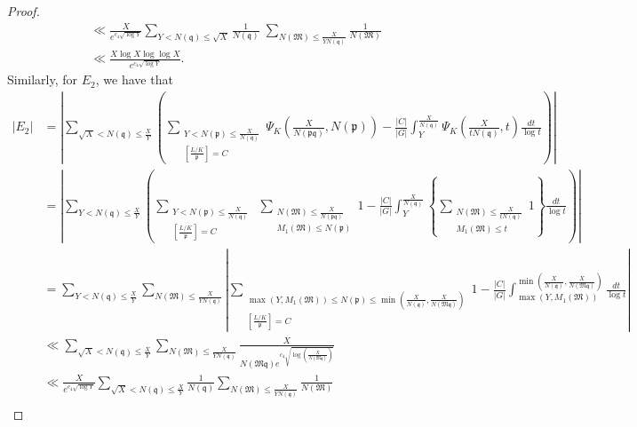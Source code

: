 \documentclass[12pt]{article}
\numberwithin{equation}{section}
\numberwithin{equation}{section}
\begin{document}
\begin{proof}
\begin{align}
    &\ll \frac{X}{e^{c_4\sqrt{\log Y}}}\sum_{Y<N(\mathfrak{q})\leq \sqrt{X}}\frac{1}{N(\mathfrak{q})} \;\sum_{N(\mathfrak{M}) \leq \frac{X}{YN(\mathfrak{q})}}\frac{1}{N(\mathfrak{M})} \nonumber \\ 
    &\ll \frac{X\log X\log\log X}{e^{c_4\sqrt{\log Y}}}.
\end{align}
Similarly, for $E_2$, we have that
\begin{align}
    |E_2| &= \left| \sum_{\sqrt{X}<N(\mathfrak{q})\leq\frac{X}{Y}}\left(\sum_{\substack{Y<N(\mathfrak{p})\leq \frac{X}{N(\mathfrak{q})} \\ \left[\frac{L/K}{\mathfrak{p}}\right] =C}} \Psi_K\left(\frac{X}{N(\mathfrak{p}\mathfrak{q})},N(\mathfrak{p})\right) - \frac{|C|}{|G|}\int_Y^{\frac{X}{N(\mathfrak{q})}} \Psi_K\left(\frac{X}{tN(\mathfrak{q})},t\right)\frac{dt}{\log t}\right)\right|  \nonumber \\
    &= \left| \sum_{Y<N(\mathfrak{q})\leq \frac{X}{Y}}\left(\sum_{\substack{Y<N(\mathfrak{p})\leq \frac{X}{N(\mathfrak{q})} \\ \left[\frac{L/K}{\mathfrak{p}}\right] =C}}\; \sum_{\substack{N(\mathfrak{M}) \leq \frac{X}{N(\mathfrak{pq})} \\ M_1(\mathfrak{M})\leq N(\mathfrak{p})}} 1- \frac{|C|}{|G|}\int_Y^{\frac{X}{N(\mathfrak{q})}} \left\{\sum_{\substack{N(\mathfrak{M}) \leq \frac{X}{tN(\mathfrak{q})} \\ M_1(\mathfrak{M})\leq t}}1\right\}\frac{dt}{\log t}\right)\right| \nonumber \\
    &= \sum_{Y<N(\mathfrak{q})\leq \frac{X}{Y}} \sum_{N(\mathfrak{M}) \leq \frac{X}{YN(\mathfrak{q})}}\left|           \sum_{\substack{\max(Y,M_1(\mathfrak{M}))\leq N(\mathfrak{p})\leq  \min\left(\frac{X}{N(\mathfrak{q})},\frac{X}{N(\mathfrak{Mq})}\right) \\  \left[\frac{L/K}{\mathfrak{p}}\right] =C            }       }      1    - \frac{|C|}{|G|}\int_{\max(Y,M_1(\mathfrak{M}))}^{\min\left(\frac{X}{N(\mathfrak{q})},\frac{X}{N(\mathfrak{Mq})}\right)}\frac{dt}{\log t}          \right| \nonumber \\
     &\ll \sum_{\sqrt{X}<N(\mathfrak{q}) \leq \frac{X}{Y}}\sum_{N(\mathfrak{M}) \leq \frac{X}{YN(\mathfrak{q})}} \frac{X}{N(\mathfrak{Mq})e^{c_4\sqrt{\log\left(\frac{X}{N(\mathfrak{Mq})}\right)}}} \nonumber \\
    &\ll \frac{X}{e^{c_4\sqrt{\log Y}}}\sum_{\sqrt{X}<N(\mathfrak{q})\leq \frac{X}{Y}}\frac{1}{N(\mathfrak{q})}\sum_{N(\mathfrak{M})\leq \frac{X}{YN(\mathfrak{q})}}\frac{1}{N(\mathfrak{M})} \nonumber \\

\end{align}
\end{proof}
\end{document}
